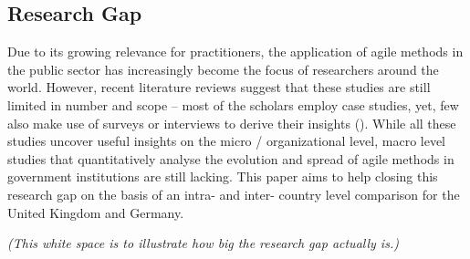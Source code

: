 \subsection{Research Gap}
Due to its growing relevance for practitioners, the application of agile methods in the public sector has increasingly become the focus of researchers around the world. However, recent literature reviews suggest that these studies are still limited in number and scope – most of the scholars employ case studies, yet, few also make use of surveys or interviews to derive their insights (\cite{CarvalhoFernandes2016, Vacari2015, Mergel2018, Mergel}). While all these studies uncover useful insights on the micro / organizational level, macro level studies that quantitatively analyse the evolution and spread of agile methods in government institutions are still lacking. This paper aims to help closing this research gap on the basis of an intra- and inter- country level comparison for the United Kingdom and Germany. 


\vspace{12cm}

\begin{center}
\tiny{\textit{(This white space is to illustrate how big the research gap actually is.)}}
\end{center}